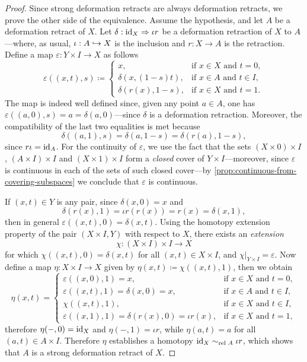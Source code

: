 \begin{proof}
Since strong deformation retracts are always deformation retracts, we prove the
other side of the equivalence. Assume the hypothesis, and let \(A\) be a
deformation retract of \(X\). Let \(\delta: \operatorname{id}_X \Rightarrow \iota r\) be a
deformation retraction of \(X\) to \(A\)---where, as usual, \(\iota: A \hookrightarrow X\)
is the inclusion and \(r: X \to A\) is the retraction. Define a map
\(\varepsilon: Y \times I \to X\) as follows
\[
\varepsilon((x, t), s) \coloneq
\begin{cases}
  x,                   &\text{if } x \in X \text{ and } t = 0, \\
  \delta(x, (1-s)t),   &\text{if } x \in A \text{ and } t \in I, \\
  \delta(r(x), 1 - s), &\text{if } x \in X \text{ and } t = 1.
\end{cases}
\]
The map is indeed well defined since, given any point \(a \in A\), one has
\(\varepsilon((a, 0), s) = a = \delta(a, 0)\)---since \(\delta\) is a
deformation retraction. Moreover, the compatibility of the last two equalities
is met because
\[
\delta((a, 1), s) = \delta(a, 1 - s) = \delta(r(a), 1 - s),
\]
since \(r \iota = \operatorname{id}_A\). For the continuity of \(\varepsilon\), we use the
fact that the sets \((X \times 0) \times I\), \((A \times I) \times I\) and
\((X \times 1) \times I\) form a \emph{closed} cover of
\(Y \times I\)---moreover, since \(\varepsilon\) is continuous in each of the
sets of such closed cover---by \cref{prop:continuous-from-covering-subspaces} we
conclude that \(\varepsilon\) is continuous.

If \((x, t) \in Y\) is any pair, since \(\delta(x, 0) = x\) and
\[
\delta(r(x), 1) = \iota r(r(x)) = r(x) = \delta(x, 1),
\]
then in general \(\varepsilon((x, t), 0) = \delta(x, t)\). Using the homotopy
extension property of the pair \((X \times I, Y)\) with respect to \(X\), there
exists an \emph{extension}
\[
\chi: (X \times I) \times I \to X
\]
for which \(\chi((x, t), 0) = \delta(x, t)\) for all \((x, t) \in X \times I\),
and \(\chi|_{Y \times I} = \varepsilon\). Now define a map \(\eta: X \times I
\to X\) given by \(\eta(x, t) \coloneq \chi((x, t), 1)\), then we obtain
\[
\eta(x, t) =
\begin{cases}
  \varepsilon((x, 0), 1) = x,
    &\text{if } x \in X \text{ and } t = 0,
  \\
  \varepsilon((x, t), 1) = \delta(x, 0) = x,
    &\text{if } x \in A \text{ and } t \in I,
  \\
  \chi((x, t), 1), &\text{if } x \in X \text{ and } t \in I,
  \\
  \varepsilon((x, 1), 1)
    = \delta(r(x), 0) = \iota r(x),
    &\text{if } x \in X \text{ and } t = 1,
\end{cases}
\]
therefore \(\eta(-, 0) = \operatorname{id}_X\) and \(\eta(-, 1) = \iota r\), while \(\eta(a,
t) = a\) for all \((a, t) \in A \times I\). Therefore \(\eta\) establishes a
homotopy \(\operatorname{id}_X \sim_{\text{rel }{A}} \iota r\), which shows that \(A\) is a strong
deformation retract of \(X\).
\end{proof}

